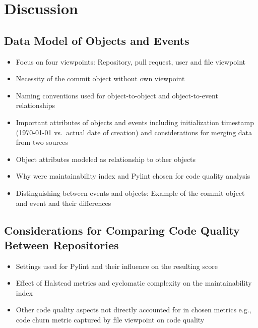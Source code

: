 \chapter{Discussion}
\label{chap:discussion}

\section{Data Model of Objects and Events}
\begin{itemize}
	\item Focus on four viewpoints: Repository, pull request, user and file viewpoint
	\item Necessity of the commit object without own viewpoint
	\item Naming conventions used for object-to-object and object-to-event relationships
	\item Important attributes of objects and events including initialization timestamp (1970-01-01 vs.\ actual date of creation) and considerations for merging data from two sources
	\item Object attributes modeled as relationship to other objects
	\item Why were maintainability index and Pylint chosen for code quality analysis
	\item Distinguishing between events and objects: Example of the commit object and event and their differences
\end{itemize}

\section{Considerations for Comparing Code Quality Between Repositories}
\begin{itemize}
\item Settings used for Pylint and their influence on the resulting score
\item Effect of Halstead metrics and cyclomatic complexity on the maintainability index
\item Other code quality aspects not directly accounted for in chosen metrics e.g., code churn metric captured by file viewpoint on code quality
\end{itemize}